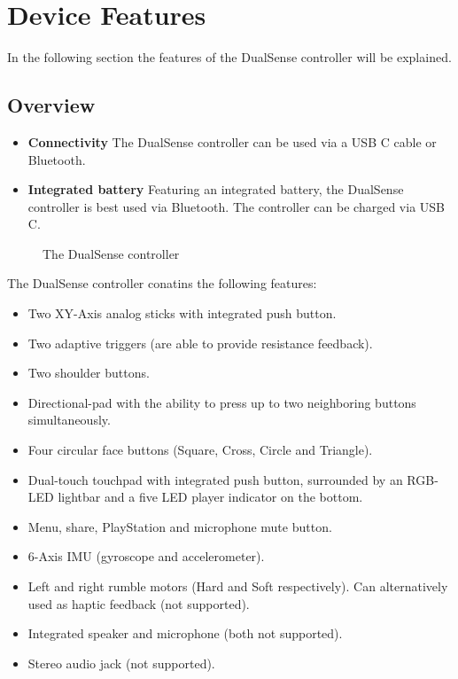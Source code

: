 \section{Device Features}
In the following section the features of the DualSense controller will be explained.

\subsection{Overview}
\begin{itemize}
	\item \textbf{Connectivity} The DualSense controller can be used via a USB C cable or Bluetooth.
	\item \textbf{Integrated battery} Featuring an integrated battery, the DualSense controller is best used via Bluetooth. The controller can be charged via USB C.
\end{itemize}

\begin{figure}[H]
    \centering
    \qquad
    \caption{The DualSense controller}
\end{figure}

The DualSense controller conatins the following features:
\begin{itemize}
	\item Two XY-Axis analog sticks with integrated push button.
	\item Two adaptive triggers (are able to provide resistance feedback).
	\item Two shoulder buttons.
	\item Directional-pad with the ability to press up to two neighboring buttons simultaneously.
	\item Four circular face buttons (Square, Cross, Circle and Triangle).
	\item Dual-touch touchpad with integrated push button, surrounded by an RGB-LED lightbar and a five LED player indicator on the bottom.
	\item Menu, share, PlayStation and microphone mute button.
	\item 6-Axis IMU (gyroscope and  accelerometer).
	\item Left and right rumble motors (Hard and Soft respectively). Can alternatively used as haptic feedback (not supported).
	\item Integrated speaker and microphone (both not supported).
	\item Stereo audio jack (not supported).	
\end{itemize}

